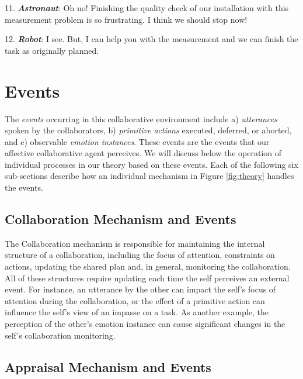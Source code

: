 \documentclass[12pt]{report}
\begin{document}
  11. \textbf{\textit{Astronaut}}: Oh no! Finishing the quality check of our
  installation with this measurement problem is so frustrating. I think we
  should stop now!

  12. \textbf{\textit{Robot}}: I see. But, I can help you with the measurement  
  and we can finish the task as originally planned.

\section{Events}
\label{sec:events}

The \textit{events} occurring in this collaborative environment include a)
\textit{utterances} spoken by the collaborators, b) \textit{primitive actions}
executed, deferred, or aborted, and c) observable \textit{emotion instances}.
These events are the events that our affective collaborative agent perceives. We
will discuss below the operation of individual processes in our theory based on
these events. Each of the following six sub-sections describe how an individual
mechanism in Figure \ref{fig:theory} handles the events.

\subsection{Collaboration Mechanism and Events}

The Collaboration mechanism is responsible for maintaining the internal
structure of a collaboration, including the focus of attention, constraints on
actions, updating the shared plan and, in general, monitoring the collaboration.
All of these structures require updating each time the self perceives an
external event. For instance, an utterance by the other can impact the self's
focus of attention during the collaboration, or the effect of a primitive action
can influence the self's view of an impasse on a task. As another example, the
perception of the other's emotion instance can cause significant changes in the
self's collaboration monitoring.

\subsection{Appraisal Mechanism and Events}
\label{sec:appraisal-event}
\end{document}
